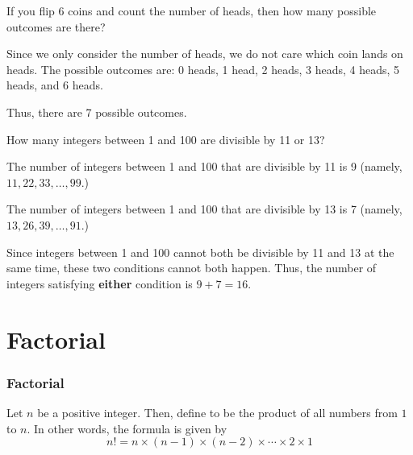\begin{frame}[t]
\begin{ex}
If you flip 6 coins and count the number of heads, then how many possible outcomes are there?
\end{ex}
\begin{sol}
Since we only consider the number of heads, we do not care which coin lands on heads. \pa The possible outcomes are: 0 heads, 1 head, 2 heads, 3 heads, 4 heads, 5 heads, and 6 heads. \pa

\medskip
Thus, there are 7 possible outcomes.
\end{sol}
\end{frame}


\begin{frame}[t]
\begin{ex}
How many integers between 1 and 100 are divisible by 11 or 13?
\end{ex}
\begin{sol}
The number of integers between 1 and 100 that are divisible by 11 is 9 (namely, $11, 22, 33, \ldots, 99$.)
\bigskip

The number of integers between 1 and 100 that are divisible by 13 is 7 (namely, $13, 26, 39, \ldots, 91$.)
\bigskip

Since integers between 1 and 100 cannot both be divisible by 11 and 13 at the same time, these two conditions cannot both happen. Thus, the number of integers satisfying \textbf{either} condition is $9 + 7 = 16$.
\end{sol}
\end{frame}

\section{Factorial}
\frame{\sectionpage}

\begin{frame}
\frametitle{Factorial}
\begin{defn}{}{}
Let $n$ be a positive integer. Then, define  to be the product of all numbers from $1$ to $n$. In other words, the formula is given by
\begin{equation}
n! = n \times (n-1) \times (n-2) \times \cdots \times 2 \times 1
\end{equation}
\end{defn}
\end{frame}


